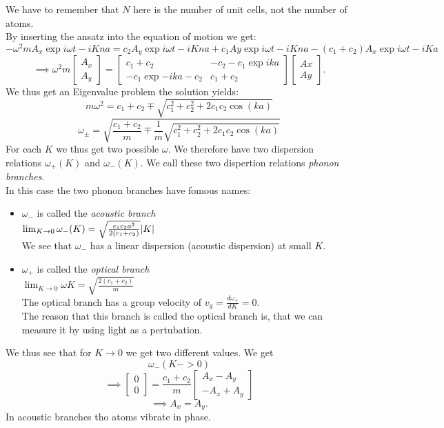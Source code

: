 \documentclass{report}
\begin{document}
We have to remember that $N$ here is the number of unit cells, not the number of atoms. \\
By inserting the ansatz into the equation of motion we get: \[
	-\omega^2 m A_x \exp{i\omega t - i Kna} = c_2 A_y \exp{i\omega t - i Kna} + c_1 Ay \exp{i\omega t - i Kna} - \left( c_1+c_2 \right) A_x \exp{i\omega t - iKa}
\] \[
\implies \omega^2 m \begin{bmatrix} A_x \\ A_y \end{bmatrix} = \begin{bmatrix} c_1+c_2 & -c_2-c_1\exp{ika}\\ -c_1 \exp{-ika}-c_2 &  c_1+c_2 \end{bmatrix} \begin{bmatrix} Ax \\ Ay \end{bmatrix} 
.\] We thus get an  Eigenvalue problem the solution yields: \[
m\omega^2 = c_1+c_2 \mp \sqrt{c_1^2 + c_2^2 + 2c_1c_2 \cos\left( ka \right) } 
\] \[
\omega_{\pm} = \sqrt{\frac{c_1+c_2}{m} \mp \frac{1}{m} \sqrt{c_1^2 + c_2^2 + 2c_1c_2\cos\left( ka \right) } } 
\]  For each $K$ we thus get two possible $\omega$. We therefore have two dispersion relations $\omega_+\left( K \right) $ and $\omega_-\left( K \right) $. We call these two dispertion relations \emph{phonon branches}. \\
In this case the two phonon branches have fomous names:
\begin{itemize}
	\item $\omega_-$ is called the \emph{acoustic branch}\\
		$\lim_{K \to 0} \omega_-(K) = \sqrt{\frac{c_1c_2 a^2}{2\left( c_1+c_2 \right) }} \abs{K}$\\
		We see that $\omega_-$ has a linear dispersion (acoustic dispersion) at small $K$.
	\item $\omega_+$ is called the \emph{optical branch}\\
		$\lim_{K \to 0} \omega{K} = \sqrt{\frac{2 \left( c_1+c_2 \right) }{m}} $\\
		The optical branch has a group velocity of $v_g = \frac{d\omega_+}{dK} = 0$.\\
		The reason that this branch is called the optical branch is, that we can measure it by using light as a pertubation.
\end{itemize}
We thus see that for $K \to 0$ we get two different values. We get \[
	\omega_-(K ->0)
\]\[
\implies \begin{bmatrix} 0 \\ 0 \end{bmatrix} = \frac{c_1 + c_2}{m} \begin{bmatrix} A_x - A_y \\ -A_x + A_y \end{bmatrix} 
\] \[
\implies A_x = A_y
.\] In acoustic branches tho atoms vibrate in phase.\\
\end{document}
